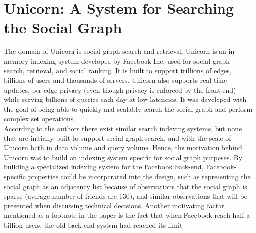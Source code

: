\documentclass{article}
\begin{document}
\section*{Unicorn: A System for Searching the Social Graph}


The domain of Unicorn is social graph search and retrieval. Unicorn is an in-memory indexing system developed by Facebook Inc. used for social graph search, retrieval, and social ranking. It is built to support trillions of edges, billions of users and thousands of servers. Unicorn also supports real-time updates, per-edge privacy (even though privacy is enforced by the front-end) while serving billions of queries each day at low latencies. It was developed with the goal of being able to quickly and scalably search the social graph and perform complex set operations. \\


\noindent According to the authors there exist similar search indexing systems, but none that are initially built to support social graph search, and with the scale of Unicorn both in data volume and query volume. Hence, the motivation behind Unicorn was to build an indexing system specific for social graph purposes. By building a specialized indexing system for the Facebook back-end, Facebook-specific properties could be incorporated into the design, such as representing the social graph as an adjacency list because of observations that the social graph is sparse (average number of friends are 130), and similar observations that will be presented when discussing technical decisions. Another motivating factor mentioned as a footnote in the paper is the fact that when Facebook reach half a billion users, the old back-end system had reached its limit.\\
\end{document}
